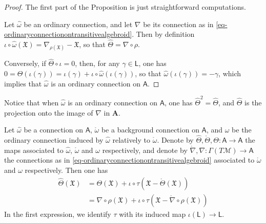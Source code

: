\documentclass[number]{elsarticle}
\theoremstyle{definition}
\theoremstyle{remark}
\numberwithin{equation}{section}
\begin{document}
\begin{proof}
The first part of the Proposition is just straightforward computations.

Let ${\widehat{\omega}}$ be an ordinary connection, and let $\nabla$ be its connection as in \eqref{eq-ordinaryconnectionontransitivealgebroid}. Then by definition $\iota \circ {\widehat{\omega}}({{\mathfrak X}}) = \nabla_{\rho({{\mathfrak X}})} - {{\mathfrak X}}$, so that ${{\widehat{\Theta}}} = \nabla \circ \rho$. 

Conversely, if ${{\widehat{\Theta}}} \circ \iota = 0$, then, for any $\gamma \in {{{{\mathbf{\mathsf{{L}}}}}}}$, one has $0 = {{\widehat{\Theta}}}(\iota(\gamma)) = \iota(\gamma) + \iota \circ {\widehat{\omega}}(\iota(\gamma))$, so that ${\widehat{\omega}}(\iota(\gamma)) = -\gamma$, which implies that ${\widehat{\omega}}$ is an ordinary connection on ${{{{\mathbf{\mathsf{{A}}}}}}}$.
\end{proof}

Notice that when ${\widehat{\omega}}$ is an ordinary connection on ${{{{\mathbf{\mathsf{{A}}}}}}}$, one has ${{\widehat{\Theta}}}^2={{\widehat{\Theta}}}$, and ${{\widehat{\Theta}}}$ is the projection onto the image of $\nabla$ in ${{{{\mathbf{{A}}}}}}$.

Let ${\widehat{\omega}}$ be a connection on ${{{{\mathbf{\mathsf{{A}}}}}}}$, ${{\mathring{{\omega}}}}$ be a background connection on ${{{{\mathbf{\mathsf{{A}}}}}}}$, and $\omega$ be the ordinary connection induced by ${\widehat{\omega}}$ relatively to ${{\mathring{{\omega}}}}$. Denote by ${{\widehat{\Theta}}}, {{\mathring{{\Theta}}}}, {\Theta} : {{{{\mathbf{\mathsf{{A}}}}}}} \rightarrow {{{{\mathbf{\mathsf{{A}}}}}}}$ the maps associated to ${\widehat{\omega}}$, ${{\mathring{{\omega}}}}$ and $\omega$ respectively, and denote by ${{\mathring{{\nabla}}}}, \nabla : \Gamma(T{{{{\mathcal{{M}}}}}}) \rightarrow {{{{\mathbf{\mathsf{{A}}}}}}}$ the connections as in \eqref{eq-ordinaryconnectionontransitivealgebroid} associated to ${{\mathring{{\omega}}}}$ and $\omega$ respectively. Then one has
\begin{align*}
{{\widehat{\Theta}}}({{\mathfrak X}}) &= {\Theta}({{\mathfrak X}})+\iota\circ{\tau}({{\mathfrak X}}-{{\mathring{{\Theta}}}}({{\mathfrak X}})) \\
&= \nabla\circ\rho({{\mathfrak X}})+\iota\circ{\tau}({{\mathfrak X}}-{{\mathring{{\nabla}}}}\circ\rho({{\mathfrak X}}))
\end{align*}
In the first expression, we identify ${\tau}$ with its induced map $\iota({{{{\mathbf{\mathsf{{L}}}}}}}) \rightarrow {{{{\mathbf{\mathsf{{L}}}}}}}$.
\end{document}
